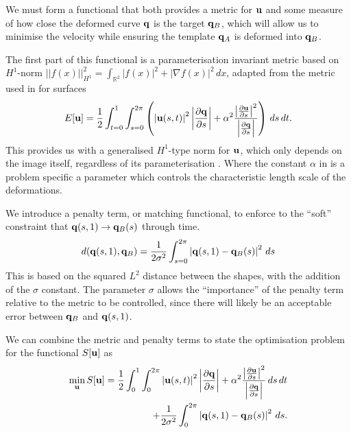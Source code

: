 \documentclass[a4paper, 12pt]{article}
\begin{document}
We must form a functional that both provides a metric for $\mathbf{u}$ and some
measure of how close the deformed curve $\mathbf{q}$ is the target $\mathbf{q}_B$,
which will allow us to minimise the velocity while ensuring the template  $\mathbf{q}_A$ is deformed into $\mathbf{q}_B$. 

The first part of this
functional is a parameterisation invariant metric based on $H^1$-norm
$||f(x)||^2_{H^1} = \int_{\mathbb{R}^2} |f(x)|^2 + |\nabla f(x)|^2\,dx$,
adapted from the metric used in \cite{bauer2011new} for surfaces
\begin{equation}
  \label{eq:metric}
  E[\mathbf{u}] = \frac{1}{2} \int^{1}_{t=0} \int^{2\pi}_{s=0}\left( \left| \mathbf{u}(s,t) \right|^2 
  \left| \frac{\partial \mathbf{q}}{\partial s} \right|  + 
  \alpha^2 \frac{ 
    \left| \frac{\partial \mathbf{u}}{\partial s}\right|^2}{
    \left| \frac{\partial \mathbf{q}}{\partial s}\right|}\right)  \,ds\,dt.
\end{equation}
This provides us with a generalised $H^1$-type norm for $\mathbf{u}$, which only
depends on the image itself, regardless of its parameterisation
\cite{bauer2011new}.  Where the constant $\alpha$ in  is a problem
specific a parameter which controls the characteristic length scale of the
deformations.

We introduce a penalty term, or matching functional, to enforce to the ``soft''
constraint that $\mathbf{q}(s,1) \rightarrow \mathbf{q}_B(s)$ through time.
\begin{equation}
  \label{eq:penalty}
  d(\mathbf{q}(s,1),\mathbf{q}_B) = \frac{1}{2\sigma^2}\int^{2\pi}_{s=0}\left| \mathbf{q}(s,1) -
    \mathbf{q}_B(s)\right|^2\,ds
\end{equation}
This is based on the squared $L^2$ distance between the shapes, with the
addition of the $\sigma$ constant. The parameter $\sigma$ allows the
``importance'' of the penalty term relative to the metric to be controlled,
since there will likely be an acceptable error between $\mathbf{q}_B$ and $\mathbf{q}(s,1)$.

We can combine the metric  and penalty  terms to
state the optimisation problem for the functional $S[\mathbf{u}]$ as
\begin{equation}
  \begin{split}
  \label{eq:S}
  \min_{\mathbf{u}} S[\mathbf{u}] = \frac{1}{2} \int^{1}_{0} \int^{2\pi}_{0}\left| \mathbf{u}(s,t) \right|^2 
  \left| \frac{\partial \mathbf{q}}{\partial s} \right|  + 
  \alpha^2 \frac{ 
    \left| \frac{\partial \mathbf{u}}{\partial s}\right|^2}{
    \left| \frac{\partial \mathbf{q}}{\partial s}\right|} \,ds\,dt \\
  + \frac{1}{2\sigma^2}\int^{2\pi}_{0}\left| \mathbf{q}(s,1) - \mathbf{q}_B(s)\right|^2\,ds.
  \end{split}
\end{equation}
\end{document}
